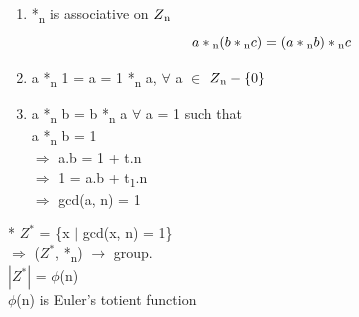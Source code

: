 \documentclass[11pt]{article}
\begin{document}
	\begin{enumerate}
		\item *\textsubscript{n} is associative on $Z\textsubscript{n}$ $$a*\textsubscript{n}(b*\textsubscript{n}c) = (a*\textsubscript{n}b)*\textsubscript{n}c$$
		\item a *\textsubscript{n} 1 = a = 1 *\textsubscript{n} a, $\forall$ a $\in$ $Z\textsubscript{n}-\{0\}$
		\item a *\textsubscript{n} b = b *\textsubscript{n} a $\forall$ a = 1 such that \\ a *\textsubscript{n} b = 1\\$\Rightarrow$ a.b = 1 + t.n\\$\Rightarrow$ 1 = a.b + t\textsubscript{1}.n\\$\Rightarrow$ gcd(a, n) = 1
	\end{enumerate}
	\mbox{*} $Z^*$ = \{x $|$ gcd(x, n) = 1\}\\
	$\Rightarrow$ ($Z^*$, *\textsubscript{n}) $\rightarrow$ group.\\
	$|Z^*|$ = $\phi$(n)\\
	$\phi$(n) is Euler's totient function\\
\end{document}
